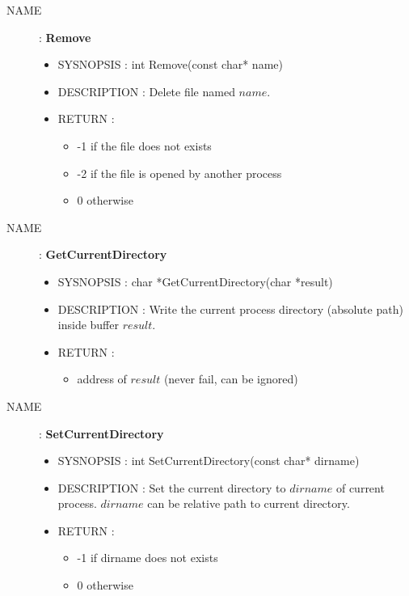 \begin{description}
            \item [NAME] : \textbf{Remove}
                \begin{itemize}
                    \item SYSNOPSIS : int Remove(const char* name)
                    \item DESCRIPTION :
                        Delete file named $name$.
                    \item RETURN :
                        \begin{itemize}
                            \item -1 if the file does not exists
                            \item -2 if the file is opened by another process
                            \item 0 otherwise
                        \end{itemize}
                \end{itemize}

            \item [NAME] : \textbf{GetCurrentDirectory}
                \begin{itemize}
                    \item SYSNOPSIS : char *GetCurrentDirectory(char *result)
                    \item DESCRIPTION :
                        Write the current process directory (absolute path) inside buffer $result$.
                    \item RETURN :
                        \begin{itemize}
                            \item address of $result$ (never fail, can be ignored)
                        \end{itemize}
                \end{itemize}

            \item [NAME] : \textbf{SetCurrentDirectory}
                \begin{itemize}
                    \item SYSNOPSIS : int SetCurrentDirectory(const char* dirname)
                    \item DESCRIPTION :
                        Set the current directory to $dirname$ of current process.
                        $dirname$ can be relative path to current directory.
                    \item RETURN :
                        \begin{itemize}
                            \item -1 if dirname does not exists
                            \item 0 otherwise
                        \end{itemize}
                \end{itemize}
        \end{description}


